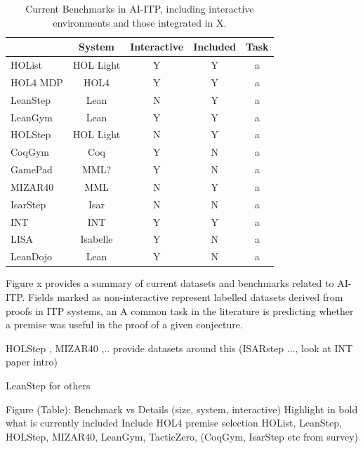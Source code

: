 \documentclass[letterpaper]{article} %
\begin{document}
    \begin{table}[ht]
        \centering
        \begin{tabular}[t]{lcccc}
            \hline
            & System    & Interactive & Included & Task \\
            \hline
            HOList   & HOL Light & Y           & Y        & a    \\
            HOL4 MDP & HOL4      & Y           & Y        & a    \\
            LeanStep & Lean      & N           & Y        & a    \\
            LeanGym  & Lean      & Y           & Y        & a    \\
            HOLStep  & HOL Light & N           & Y        & a    \\
            CoqGym   & Coq       & Y           & N        & a    \\
            GamePad  & MML?      & Y           & N        & a    \\
            MIZAR40  & MML       & N           & Y        & a    \\
            IsarStep & Isar      & N           & N        & a    \\
            INT      & INT       & Y           & Y        & a    \\
            LISA     & Isabelle  & Y           & N        & a    \\
            LeanDojo & Lean      & Y           & N        & a    \\
            \hline
        \end{tabular}
        \caption{Current Benchmarks in AI-ITP, including interactive environments and those integrated in X.}
    \end{table}%


    Figure x provides a summary of current datasets and benchmarks related to AI-ITP.
    Fields marked as non-interactive represent labelled datasets derived from proofs in ITP systems, an
    A common task in the literature is predicting whether a premise was useful in the proof of a given conjecture.

    HOLStep \cite{kaliszyk_holstep_2017}, MIZAR40 \cite{kaliszyk_mizar_2015},.. provide datasets around this (ISARstep ..., look at INT paper intro)

    LeanStep for others

    Figure (Table):
    Benchmark vs Details (size, system, interactive)
    Highlight in bold what is currently included
    Include HOL4 premise selection
    HOList, LeanStep, HOLStep, MIZAR40, LeanGym, TacticZero, (CoqGym, IsarStep etc from survey)
\end{document}
